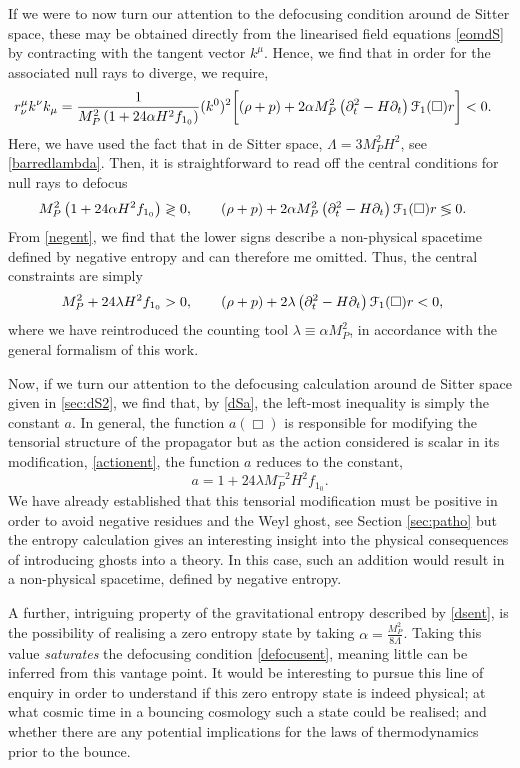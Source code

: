 If we were to now turn our attention to the defocusing condition around de Sitter space, these may be obtained directly from the linearised field equations \eqref{eomdS} by contracting with the tangent vector $k^\mu$. Hence, we find that in order for the associated null rays to diverge, we require,
 \[
 \label{defocusent}
 \begin{aligned}r_{\nu}^{\mu}k^{\nu}k_{\mu} & =\frac{1}{M_{P}^{2}\left(1+24\alpha  H^2 f_{1_{0}}\right)}(k^{0})^{2}\biggl[(\rho+p)+2\alpha M_{P}^{2}\left(\partial_{t}^{2}-H\partial_{t}\right){\cal F}_{1}(\Box)r\biggr]<0
. \end{aligned}
\]
Here, we have used the fact that in de Sitter space, $\Lambda=3M_P^2 H^2$, see \eqref{barredlambda}. Then, it is straightforward to read off the central conditions for null rays to defocus
\[
\begin{aligned}M_{P}^{2}\left(1+24\alpha  H^2 f_{1_{0}}\right)\gtrless0
 ,\qquad(\rho+p)+2\alpha M_{P}^{2}\left(\partial_{t}^{2}-H\partial_{t}\right){\cal F}_{1}(\Box)r & \lessgtr0.\end{aligned}
  \]
From \eqref{negent}, we find that the lower signs describe a non-physical spacetime defined by negative entropy and can therefore me omitted. Thus, the central constraints are simply
\[
\begin{aligned}M_{P}^{2}+24\lambda H^2 f_{1_{0}}>0
  ,\qquad(\rho+p)+2\lambda\left(\partial_{t}^{2}-H\partial_{t}\right){\cal F}_{1}(\Box)r & <0,\end{aligned}
  \]
where we have reintroduced the counting tool $\lambda\equiv \alpha M_P^2$, in accordance with the general formalism of this work.

Now, if we turn our attention to the defocusing calculation around de Sitter space given in \ref{sec:dS2}, we find that, by \eqref{dSa}, the left-most inequality is simply the constant $a$. In general, the function $a(\Box)$ is responsible for modifying the tensorial structure of the propagator but as the action considered is scalar in its modification, \eqref{actionent}, the function $a$ reduces to the constant,
\[
a=1+24\lambda M_P^{-2} H^2 f_{1_{0}}  
.\]
We have already established that this tensorial modification must be positive in order to avoid negative residues and the Weyl ghost, see Section \ref{sec:patho} but the entropy calculation gives an interesting  insight into the physical consequences of introducing ghosts into a theory. In this case, such an addition would result in a non-physical spacetime, defined by negative entropy. 

A further, intriguing property of the gravitational entropy described by \eqref{dsent}, is the possibility of realising a zero entropy state by taking $\alpha=\frac{M_{P}^{2}}{8\Lambda}$. Taking this value \emph{saturates} the defocusing condition \eqref{defocusent}, meaning little can be inferred from this vantage point. It would be interesting to pursue this line of enquiry in order to understand if this zero entropy state is indeed physical; at what cosmic time in a bouncing cosmology such a state could be realised; and whether there are any potential implications for the laws of thermodynamics prior to the bounce.
